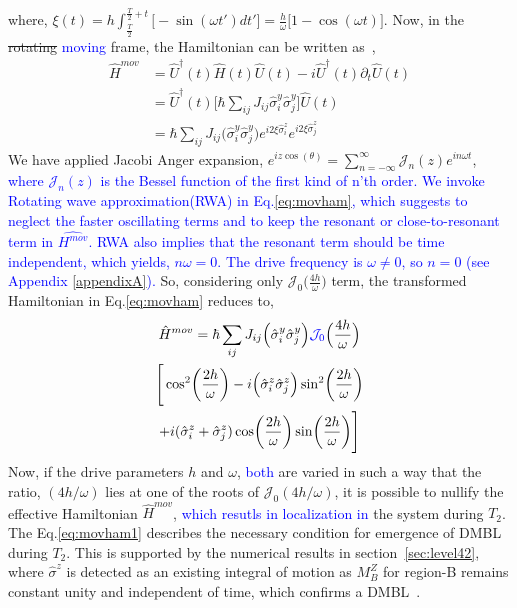 \documentclass[%
reprint,
superscriptaddress,
amsmath,amssymb,showkeys,
aps,
prb,
]{revtex4-2}
\newcommand{\blue}[1]{\textcolor{blue}{#1}}
\begin{document}
	where, $\displaystyle{
		\xi (t) = h\int_{\frac{T}{2}}^{\frac{T}{2}+t}  \Big[-\sin(\omega t')dt'\Big]=  \frac{h}{\omega}\Big[1-\cos(\omega t)\Big]}$.		
	Now, in the \sout{rotating} \blue{moving} frame, the Hamiltonian can be written as~\cite{haldar_dynamical_2021},
	\begin{align}
		\hat{H}^{mov} &= \hat{U}^\dagger(t) \hat{H}(t) \hat{U}(t)- i \hat{U}^\dagger(t) \partial_t \hat{U}(t)\nonumber\\
		&= \hat{U}^\dagger(t) \big[\hbar\sum_{ij}J_{ij}\hat{\sigma}^y_i\hat{\sigma}^y_j\big] \hat{U}(t)\nonumber\\
		&=\hbar\sum_{ij} J_{ij} \Big(\hat{\sigma}^y_i\hat{\sigma}^y_j\Big) e^{i 2\xi \hat{\sigma}^z_i}  e^{i 2\xi \hat{\sigma}^z_j}
		\label{eq:movham}
	\end{align}
	We have applied Jacobi Anger expansion, $\displaystyle e^{iz \cos(\theta)} = \sum_{n=-\infty}^{\infty} \mathcal{J}_n(z) e^{in\omega t}$, \blue{where $\mathcal{J}_n(z)$ is the Bessel function of the first kind of n'th order. We invoke Rotating wave approximation(RWA)\cite{das_exotic_2010, Ashhab2007, Kiely2018, haldar_dynamical_2017,fuji2017} in Eq.\eqref{eq:movham}, which suggests to neglect the faster oscillating terms and to keep the resonant or close-to-resonant term in $\hat{H^{mov}}$. RWA also implies that the resonant term should be time independent\cite{Ashhab2007, das_exotic_2010}, which yields, $n\omega = 0$. The drive frequency is $\omega\neq 0$, so $n=0$ (see Appendix \ref{appendixA}). }  So, considering only $\mathcal{J}_0\big(\frac{4h}{\omega}\big)$ term, the transformed Hamiltonian in Eq.\eqref{eq:movham} reduces to,
	\begin{multline}
		\hat{H}^{mov} =\hbar \sum_{ij} J_{ij} \Big(\hat{\sigma}^y_i\hat{\sigma}^y_j\Big)\blue{\mathcal{J}_0}\Big(\frac{4h}{\omega}\Big) \\\Bigg[\cos[2](\frac{2h}{\omega}) -i\Big(\hat{\sigma}^z_i\hat{\sigma}^z_j\Big) \sin[2](\frac{2h}{\omega})\\+ i (\hat{\sigma}^z_i + \hat{\sigma}^z_j)\cos(\frac{2h}{\omega})\sin(\frac{2h}{\omega})\Bigg]
		\label{eq:movham1}
	\end{multline}
	Now, if the drive parameters $h$ and $\omega$, \blue{both} are varied  in such a way that the ratio, $({4h}/{\omega})$ lies at one of the roots of $\mathcal{J}_0(4h/\omega)$, it is possible to nullify the effective Hamiltonian $\hat{H}^{mov}$, \blue{which resutls in localization in} the system during $T_2$. The Eq.\eqref{eq:movham1} describes the necessary condition for emergence of DMBL during $T_2$. This is supported by the numerical results in section~\ref{sec:level42}, where $\hat{\sigma}^z$ is detected as an existing integral of motion as $M^Z_B$ for region-B remains constant unity and independent of time, which confirms a DMBL~\cite{Keser2016,Dodonov1978}. 
	
\end{document}
